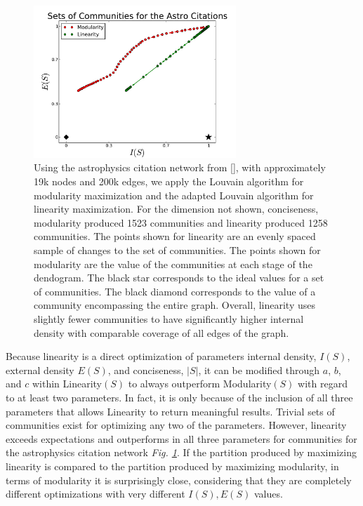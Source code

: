 \documentclass[conference]{IEEEtran}
\begin{document}
\begin{figure}[!h]
\centering
\includegraphics[width=3in]{Figures/astro_ml}
\caption{Using the astrophysics citation network from [], with approximately 19k nodes and 200k edges, we apply the Louvain algorithm for modularity maximization and the adapted Louvain algorithm for linearity maximization.  For the dimension not shown, conciseness, modularity produced 1523 communities and linearity produced 1258 communities.  The points shown for linearity are an evenly spaced sample of changes to the set of communities.  The points shown for modularity are the value of the communities at each stage of the dendogram.
The black star corresponds to the ideal values for a set of communities.  The black diamond corresponds to the value of a community encompassing the entire graph.  Overall, linearity uses slightly fewer communities to have significantly higher internal density with comparable coverage of all edges of the graph.}
\label{fig_astro}
\end{figure}

Because linearity is a direct optimization of parameters internal density, $I(S)$, external density $E(S)$, and conciseness, $|S|$,  it can be modified through $a$, $b$, and $c$ within {\sc Linearity}$(S)$ to always outperform {\sc Modularity}$(S)$ with regard to at least two parameters.  In fact, it is only because of the inclusion of all three parameters that allows {\sc Linearity} to return meaningful results.  Trivial sets of communities exist for optimizing any two of the parameters.  However, linearity exceeds expectations and outperforms in all three parameters for communities for the astrophysics citation network {\it Fig. \ref{fig_astro}}.  If the partition produced by maximizing linearity is compared to the partition produced by maximizing modularity, in terms of modularity it is surprisingly close, considering that they are completely different optimizations with very different $I(S), E(S)$ values.
\end{document}
